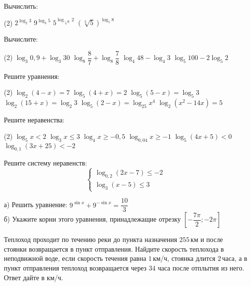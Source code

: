 \begin{class}[number=2]
	\begin{listofex}
		\item Вычислить:
		\begin{tasks}(2)
			\task \( 2^{\log_2 3} \)
			\task \( 9^{\log_3 5} \)
			\task \( 5^{\log_{\sqrt[3]{5}} 2} \)
			\task \( (\sqrt[3]{5})^{\log_5 8} \)
		\end{tasks}
		\item Вычислите:
		\begin{tasks}(2)
			\task \( \log_3 0,9 + \log_3 30 \)
			\task \( \log_8 \dfrac{8}{7} + \log_8 \dfrac{7}{8} \)
			\task \( \log_4 48 - \log_4 3 \)
			\task \( \log_5 100 - 2 \log_5 2 \)
		\end{tasks}
		\item Решите уравнения: %
		\begin{tasks}(2)
			\task \( \log_2 (4-x)=7 \)
			\task \( \log_5(4+x)=2 \)
			\task \( \log_5(5-x)=\log_5 3 \)
			\task \( \log_2(15+x)=\log_2 3 \)
			\task \( \log_5 (2-x) = \log_{25} x^4 \)
			\task \( \log_2 (x^2-14x)=5 \)
		\end{tasks}
		\item Решите неравенства: %
		\begin{tasks}(2)
			\task \( \log_5 x<2 \)
			\task \( \log_3 x \le 3 \)
			\task \( \log_4 x \ge -0,5 \)
			\task \( \log_{0,04}x \ge -1 \)
			\task \( \log_5 (4x+5) < 0 \)
			\task \( \log_{0,1} (3x+25) < -2 \)
		\end{tasks}
		\item Решите систему неравенств: %
		\[ \begin{cases} \log_{0,2}(2x-7) \le -2 \\ \log_3 (x-5) \le 3 \end{cases} \]
		\item а) Решить уравнение: \( 9^{\sin x}+9^{-\sin x}=\dfrac{10}{3} \)\\
		б) Укажите корни этого уравнения, принадлежащие отрезку \( \left[ -\dfrac{7\pi}{2};-2\pi \right] \)
		\item Теплоход проходит по течению реки до пункта назначения \( 255 \) км и после стоянки возвращается в пункт отправления. Найдите скорость теплохода в неподвижной воде, если скорость течения равна \( 1 \) км/ч, стоянка длится \( 2 \) часа, а в пункт отправления теплоход возвращается через \( 34 \) часа после отплытия из него. Ответ дайте в км/ч.
	\end{listofex}
\end{class}

